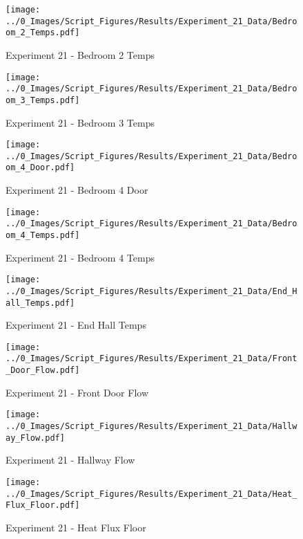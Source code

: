 	\begin{figure}[H]
		\centering
		\texttt{[image: ../0\_Images/Script\_Figures/Results/Experiment\_21\_Data/Bedroom\_2\_Temps.pdf]}
		\caption[]{Experiment 21 - Bedroom 2 Temps}
	\end{figure}
 
	\clearpage

	\begin{figure}[H]
		\centering
		\texttt{[image: ../0\_Images/Script\_Figures/Results/Experiment\_21\_Data/Bedroom\_3\_Temps.pdf]}
		\caption[]{Experiment 21 - Bedroom 3 Temps}
	\end{figure}
 

	\begin{figure}[H]
		\centering
		\texttt{[image: ../0\_Images/Script\_Figures/Results/Experiment\_21\_Data/Bedroom\_4\_Door.pdf]}
		\caption[]{Experiment 21 - Bedroom 4 Door}
	\end{figure}
 
	\clearpage

	\begin{figure}[H]
		\centering
		\texttt{[image: ../0\_Images/Script\_Figures/Results/Experiment\_21\_Data/Bedroom\_4\_Temps.pdf]}
		\caption[]{Experiment 21 - Bedroom 4 Temps}
	\end{figure}
 

	\begin{figure}[H]
		\centering
		\texttt{[image: ../0\_Images/Script\_Figures/Results/Experiment\_21\_Data/End\_Hall\_Temps.pdf]}
		\caption[]{Experiment 21 - End Hall Temps}
	\end{figure}
 
	\clearpage

	\begin{figure}[H]
		\centering
		\texttt{[image: ../0\_Images/Script\_Figures/Results/Experiment\_21\_Data/Front\_Door\_Flow.pdf]}
		\caption[]{Experiment 21 - Front Door Flow}
	\end{figure}
 

	\begin{figure}[H]
		\centering
		\texttt{[image: ../0\_Images/Script\_Figures/Results/Experiment\_21\_Data/Hallway\_Flow.pdf]}
		\caption[]{Experiment 21 - Hallway Flow}
	\end{figure}
 
	\clearpage

	\begin{figure}[H]
		\centering
		\texttt{[image: ../0\_Images/Script\_Figures/Results/Experiment\_21\_Data/Heat\_Flux\_Floor.pdf]}
		\caption[]{Experiment 21 - Heat Flux Floor}
	\end{figure}
 

